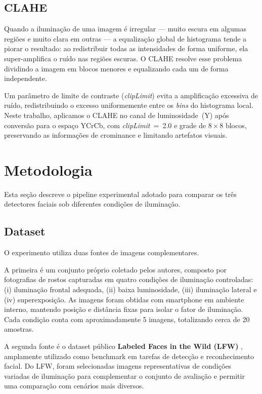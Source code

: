 \documentclass[conference]{IEEEtran}
\begin{document}
\subsection{CLAHE}
Quando a ilumina\c{c}\~ao de uma imagem \'e irregular --- muito escura em algumas regi\~oes e muito clara em outras --- a equaliza\c{c}\~ao global de histograma tende a piorar o resultado: ao redistribuir todas as intensidades de forma uniforme, ela super-amplifica o ru\'ido nas regi\~oes escuras. O CLAHE \cite{Zuiderveld1994} resolve esse problema dividindo a imagem em blocos menores e equalizando cada um de forma independente.

Um par\^ametro de limite de contraste (\textit{clipLimit}) evita a amplifica\c{c}\~ao excessiva de ru\'ido, redistribuindo o excesso uniformemente entre os \textit{bins} do histograma local. Neste trabalho, aplicamos o CLAHE no canal de luminosidade~(Y) ap\'os convers\~ao para o espa\c{c}o YCrCb, com \textit{clipLimit}~=~2.0 e grade de $8 \times 8$ blocos, preservando as informa\c{c}\~oes de crominance e limitando artefatos visuais.

\section{Metodologia}

Esta se\c{c}\~ao descreve o pipeline experimental adotado para comparar os tr\^es detectores faciais sob diferentes condi\c{c}\~oes de ilumina\c{c}\~ao.

\subsection{Dataset}

O experimento utiliza duas fontes de imagens complementares.

A primeira \'e um conjunto pr\'oprio coletado pelos autores, composto por fotografias de rostos capturadas em quatro condi\c{c}\~oes de ilumina\c{c}\~ao controladas: (i) ilumina\c{c}\~ao frontal adequada, (ii) baixa luminosidade, (iii) ilumina\c{c}\~ao lateral e (iv) superexposi\c{c}\~ao. As imagens foram obtidas com smartphone em ambiente interno, mantendo posi\c{c}\~ao e dist\^ancia fixas para isolar o fator de ilumina\c{c}\~ao. Cada condi\c{c}\~ao conta com aproximadamente 5 imagens, totalizando cerca de 20 amostras.

A segunda fonte \'e o dataset p\'ublico \textbf{Labeled Faces in the Wild (LFW)} \cite{LFWTech}, amplamente utilizado como benchmark em tarefas de detec\c{c}\~ao e reconhecimento facial. Do LFW, foram selecionadas imagens representativas de condi\c{c}\~oes variadas de ilumina\c{c}\~ao para complementar o conjunto de avalia\c{c}\~ao e permitir uma compara\c{c}\~ao com cen\'arios mais diversos.
\end{document}
